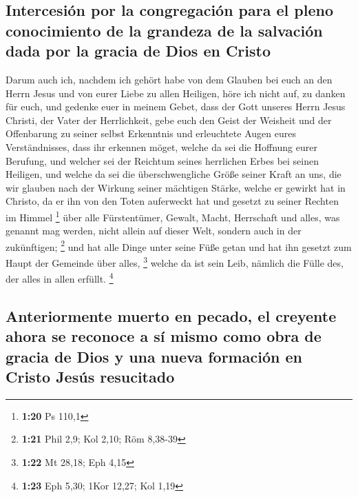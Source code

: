 \hypertarget{intercesiuxf3n-por-la-congregaciuxf3n-para-el-pleno-conocimiento-de-la-grandeza-de-la-salvaciuxf3n-dada-por-la-gracia-de-dios-en-cristo}{%
\subsection{Intercesión por la congregación para el pleno conocimiento
de la grandeza de la salvación dada por la gracia de Dios en
Cristo}\label{intercesiuxf3n-por-la-congregaciuxf3n-para-el-pleno-conocimiento-de-la-grandeza-de-la-salvaciuxf3n-dada-por-la-gracia-de-dios-en-cristo}}

 Darum auch ich, nachdem ich gehört habe von dem Glauben
bei euch an den Herrn Jesus und von eurer Liebe zu allen Heiligen,
 höre ich nicht auf, zu danken für euch, und gedenke euer
in meinem Gebet,  dass der Gott unseres Herrn Jesus
Christi, der Vater der Herrlichkeit, gebe euch den Geist der Weisheit
und der Offenbarung zu seiner selbst Erkenntnis  und
erleuchtete Augen eures Verständnisses, dass ihr erkennen möget, welche
da sei die Hoffnung eurer Berufung, und welcher sei der Reichtum seines
herrlichen Erbes bei seinen Heiligen,  und welche da sei
die überschwengliche Größe seiner Kraft an uns, die wir glauben nach der
Wirkung seiner mächtigen Stärke,  welche er gewirkt hat
in Christo, da er ihn von den Toten auferweckt hat und gesetzt zu seiner
Rechten im Himmel \footnote{\textbf{1:20} Ps 110,1}  über
alle Fürstentümer, Gewalt, Macht, Herrschaft und alles, was genannt mag
werden, nicht allein auf dieser Welt, sondern auch in der zukünftigen;
\footnote{\textbf{1:21} Phil 2,9; Kol 2,10; Röm 8,38-39} 
und hat alle Dinge unter seine Füße getan und hat ihn gesetzt zum Haupt
der Gemeinde über alles, \footnote{\textbf{1:22} Mt 28,18; Eph 4,15}
 welche da ist sein Leib, nämlich die Fülle des, der
alles in allen erfüllt. \footnote{\textbf{1:23} Eph 5,30; 1Kor 12,27;
  Kol 1,19}

\hypertarget{anteriormente-muerto-en-pecado-el-creyente-ahora-se-reconoce-a-suxed-mismo-como-obra-de-gracia-de-dios-y-una-nueva-formaciuxf3n-en-cristo-jesuxfas-resucitado}{%
\subsection{Anteriormente muerto en pecado, el creyente ahora se
reconoce a sí mismo como obra de gracia de Dios y una nueva formación en
Cristo Jesús
resucitado}\label{anteriormente-muerto-en-pecado-el-creyente-ahora-se-reconoce-a-suxed-mismo-como-obra-de-gracia-de-dios-y-una-nueva-formaciuxf3n-en-cristo-jesuxfas-resucitado}}

